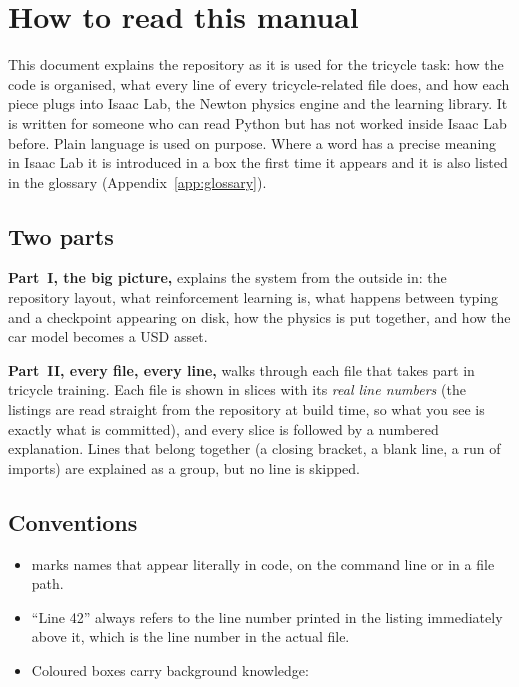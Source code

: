 \chapter*{How to read this manual}

This document explains the  repository as it is used for the
tricycle task: how the code is organised, what every line of every
tricycle-related file does, and how each piece plugs into Isaac Lab, the Newton
physics engine and the  learning library. It is written for
someone who can read Python but has not worked inside Isaac Lab before.
Plain language is used on purpose. Where a word has a precise meaning in Isaac
Lab it is introduced in a box the first time it appears and it is also listed
in the glossary (Appendix~\ref{app:glossary}).

\section*{Two parts}

\textbf{Part~I, the big picture,} explains the system from the outside in: the
repository layout, what reinforcement learning is, what happens between typing
 and a checkpoint appearing on disk, how the physics is
put together, and how the car model becomes a USD asset.

\textbf{Part~II, every file, every line,} walks through each file that takes
part in tricycle training. Each file is shown in slices with its \emph{real
line numbers} (the listings are read straight from the repository at build
time, so what you see is exactly what is committed), and every slice is
followed by a numbered explanation. Lines that belong together (a closing
bracket, a blank line, a run of imports) are explained as a group, but no
line is skipped.

\section*{Conventions}

\begin{itemize}[leftmargin=1.6em]
  \item {} marks names that appear literally in code, on the
        command line or in a file path.
  \item ``Line 42'' always refers to the line number printed in the listing
        immediately above it, which is the line number in the actual file.
  \item Coloured boxes carry background knowledge:
\end{itemize}

